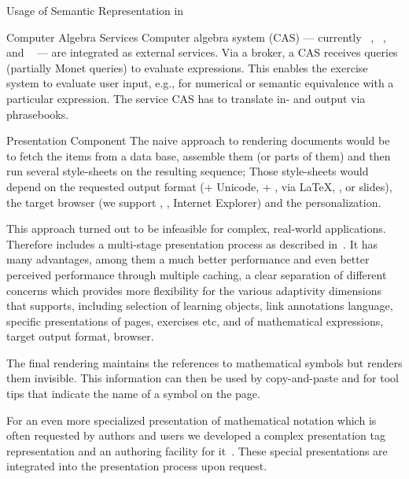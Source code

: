 \begin{omgroup}[id=activemath,short=ActiveMath,
  creators={melis,goguadse,alberto,frischauf,homik,libbrecht,cullrich}]
\begin{omgroup}{Usage of Semantic Representation in {\activemath}}
\begin{omgroup}{Computer Algebra Services}
Computer algebra system (CAS) --- currently {}~\cite{URL:Yacas},
{}~\cite{URL:Maxima}, and {}~\cite{URL:wiris-cas} --- are
integrated as external services. Via a broker, a CAS receives queries (partially Monet
queries) to evaluate {\openmath} expressions. This enables the exercise system to evaluate
user input, e.g., for numerical or semantic equivalence with a particular
expression. The service CAS has to translate in- and output via phrasebooks.
\end{omgroup}

\begin{omgroup}{Presentation Component}
The naive approach to rendering {\omdoc} documents would be to fetch the items from a data
base, assemble them (or parts of them) and then run several style-sheets on the resulting
sequence; Those style-sheets would depend on the requested output format (\html + Unicode,
\xhtml + {\mathml}, {\pdf} via {\LaTeX}, {\svg}, or slides), the target browser (we
support {\mozilla}, {\firefox}, Internet Explorer) and the personalization.

This approach turned out to be infeasible for complex, real-world applications. Therefore
{\activemath} includes a multi-stage presentation process as described
in~\cite{Ullrichetal-Presentation-ICALT04}. It has many advantages, among them a much
better performance and even better perceived performance through multiple caching, a clear
separation of different concerns which provides more flexibility for the various
adaptivity dimensions that {\activemath} supports, including selection of learning
objects, link annotations language, specific presentations of pages, exercises etc, and of
mathematical expressions, target output format, browser.

The final rendering maintains the references to mathematical symbols but renders them
invisible. This information can then be used by copy-and-paste and for tool tips that
indicate the name of a symbol on the page.

For an even more specialized presentation of mathematical notation which is often
requested by authors and users we developed a complex presentation tag representation and
an authoring facility for it~\cite{ManLib:apo05}. These special presentations are
integrated into the presentation process upon request.
\end{omgroup}


\end{omgroup}
\end{omgroup}
